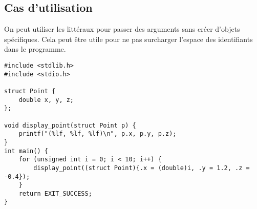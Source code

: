 \documentclass[../../../main.tex]{subfiles}
\begin{document}
\subsection{Cas d'utilisation}
\label{sub:cas_d_utilisation}
On peut utiliser les littéraux pour passer des arguments sans créer d'objets spécifiques. Cela peut être utile pour ne pas surcharger l'espace des identifiants dans le programme.
\begin{verbatim}
#include <stdlib.h>
#include <stdio.h>

struct Point {
	double x, y, z;	
};

void display_point(struct Point p) {
	printf("(%lf, %lf, %lf)\n", p.x, p.y, p.z);
}
int main() {
	for (unsigned int i = 0; i < 10; i++) {
		display_point((struct Point){.x = (double)i, .y = 1.2, .z = -0.4});
	}
	return EXIT_SUCCESS;
}
\end{verbatim}
\end{document}
